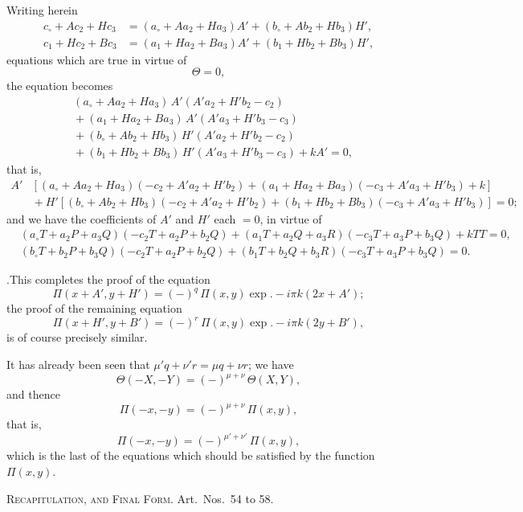 \documentclass[11pt]{article}
\begin{document}
Writing herein
\begin{align*}
c_{\circ}+Ac_2+Hc_3 &= (a_{\circ}+Aa_2+Ha_3)A'+(b_{\circ}+Ab_2+Hb_3)H',\\
c_1+Hc_2+Bc_3 &= (a_1+Ha_2+Ba_3)A'+(b_1+Hb_2+Bb_3)H',
\end{align*}
equations which are true in virtue of
\[
\Theta = 0,
\]
the equation becomes
\begin{align*}
&(a_{\circ}+Aa_2+Ha_3)\,A'(A'a_2+H'b_2-c_2)\\
&{}+ (a_1+Ha_2+Ba_3)\,A'(A'a_3+H'b_3-c_3)\\
&{}+ (b_{\circ}+Ab_2+Hb_3)\,H'(A'a_2+H'b_2-c_2)\\
&{}+ (b_1+Hb_2+Bb_3)\,H'(A'a_3+H'b_3-c_3)+kA' = 0,
\end{align*}
that is,
\begin{align*}
A'&[(a_{\circ}+Aa_2+Ha_3)(-c_2+A'a_2+H'b_2)+(a_1+Ha_2+Ba_3)(-c_3+A'a_3+H'b_3)+k]\\
&{}+ H'[(b_{\circ}+Ab_2+Hb_3)(-c_2+A'a_2+H'b_2)+(b_1+Hb_2+Bb_3)(-c_3+A'a_3+H'b_3)] = 0;
\end{align*}
and we have the coefficients of $A'$ and $H'$ each $=0$, in virtue of
\begin{align*}
&(a_{\circ}T+a_2P+a_3Q)(-c_2T+a_2P+b_2Q)+(a_1T+a_2Q+a_3R)(-c_3T+a_3P+b_3Q)+kTT = 0,\\
&(b_{\circ}T+b_2P+b_3Q)(-c_2T+a_2P+b_2Q)+(b_1T+b_2Q+b_3R)(-c_3T+a_3P+b_3Q) = 0.
\end{align*}

\medskip

.\quad This completes the proof of the equation
\[
\Pi(x+A',y+H') = (-)^q\,\Pi(x,y)\exp.-i\pi k(2x+A');
\]
the proof of the remaining equation
\[
\Pi(x+H',y+B') = (-)^r\,\Pi(x,y)\exp.-i\pi k(2y+B'),
\]
is of course precisely similar.

It has already been seen that $\mu'q+\nu'r = \mu q+\nu r$; we have
\[
\Theta(-X,-Y) = (-)^{\mu+\nu}\,\Theta(X,Y),
\]
and thence
\[
\Pi(-x,-y) = (-)^{\mu+\nu}\,\Pi(x,y),
\]
that is,
\[
\Pi(-x,-y) = (-)^{\mu'+\nu'}\,\Pi(x,y),
\]
which is the last of the equations which should be satisfied by the function $\Pi(x,y)$.

\bigskip

\begin{center}\textsc{Recapitulation, and Final Form.} \quad Art.\ Nos.\ 54 to 58.\end{center}

\medskip
\end{document}
